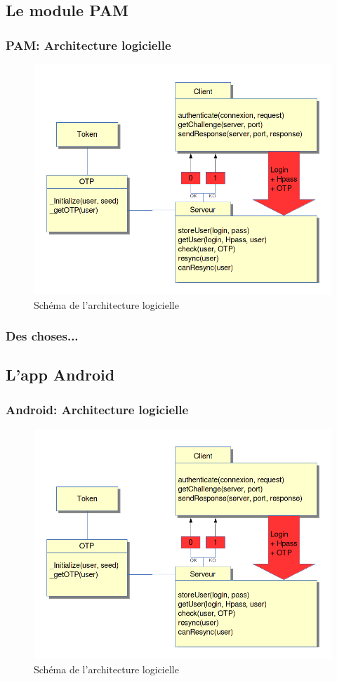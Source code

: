 \documentclass[xcolor=table]{beamer}
\begin{document}
\subsection{Le module PAM}
\begin{frame}
\frametitle{PAM: Architecture logicielle}
\begin{figure}
 \includegraphics[scale=0.3]{../graphics/architecture.png} 
 \caption{Schéma de l'architecture logicielle}
\end{figure}

\end{frame}
\begin{frame}
\frametitle{Des choses...}
\end{frame}


\subsection{L'app Android}
\begin{frame}
\frametitle{Android: Architecture logicielle}
\begin{figure}
 \includegraphics[scale=0.3]{../graphics/architecture.png} 
 \caption{Schéma de l'architecture logicielle}
\end{figure}

\end{frame}
\end{document}
